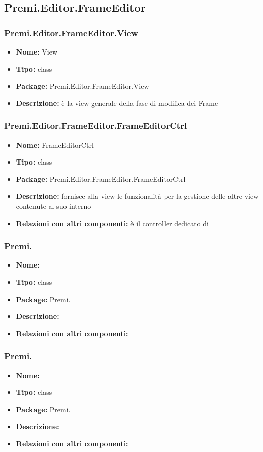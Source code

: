 \subsection{Premi.Editor.FrameEditor}
\subsubsection{Premi.Editor.FrameEditor.View}
\begin{itemize}
  \item \textbf{Nome:} View
  \item \textbf{Tipo:} class
  \item \textbf{Package:} Premi.Editor.FrameEditor.View
  \item \textbf{Descrizione:} è la view generale della fase di modifica dei Frame
\end{itemize}
\subsubsection{Premi.Editor.FrameEditor.FrameEditorCtrl}
\begin{itemize}
  \item \textbf{Nome:} FrameEditorCtrl
  \item \textbf{Tipo:} class
  \item \textbf{Package:} Premi.Editor.FrameEditor.FrameEditorCtrl
  \item \textbf{Descrizione:} fornisce alla view le funzionalità per la gestione delle altre view contenute al suo interno
  \item \textbf{Relazioni con altri componenti:} è il controller dedicato di   
\end{itemize}
\subsubsection{Premi.}
\begin{itemize}
  \item \textbf{Nome:}
  \item \textbf{Tipo:} class
  \item \textbf{Package:} Premi.
  \item \textbf{Descrizione:}
  \item \textbf{Relazioni con altri componenti:} 
\end{itemize}
\subsubsection{Premi.}
\begin{itemize}
  \item \textbf{Nome:}
  \item \textbf{Tipo:} class
  \item \textbf{Package:} Premi.
  \item \textbf{Descrizione:}
  \item \textbf{Relazioni con altri componenti:} 
\end{itemize}
